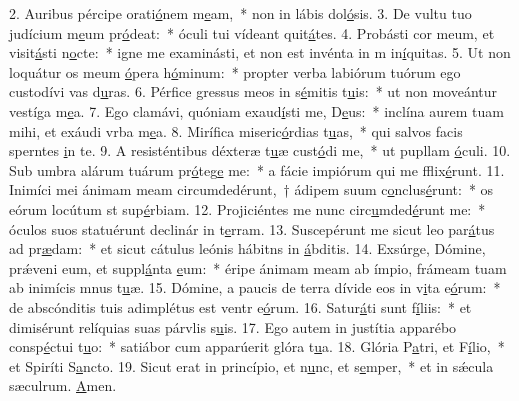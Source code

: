 2. Auribus pércipe orati\uline{ó}nem m\uline{e}am,~* non in lábis dol\uline{ó}sis.
3. De vultu tuo judícium m\uline{e}um pr\uline{ó}deat:~* óculi tui vídeant quit\uline{á}tes.
4. Probásti cor meum, et visit\uline{á}sti n\uline{o}cte:~* igne me examinásti, et non est invénta in m in\uline{í}quitas.
5. Ut non loquátur os meum \uline{ó}pera h\uline{ó}minum:~* propter verba labiórum tuórum ego custodívi vas d\uline{u}ras.
6. Pérfice gressus meos in s\uline{é}mitis t\uline{u}is:~* ut non moveántur vestíga m\uline{e}a.
7. Ego clamávi, quóniam exaud\uline{í}sti me, D\uline{e}us:~* inclína aurem tuam mihi, et exáudi vrba m\uline{e}a.
8. Mirífica miseric\uline{ó}rdias t\uline{u}as,~* qui salvos facis sperntes \uline{i}n te.
9. A resisténtibus déxteræ t\uline{u}æ cust\uline{ó}di me,~* ut pupllam \uline{ó}culi.
10. Sub umbra alárum tuárum pr\uline{ó}teg\uline{e} me:~* a fácie impiórum qui me fflix\uline{é}runt.
11. Inimíci mei ánimam meam circumdedérunt,~† ádipem suum c\uline{o}nclus\uline{é}runt:~* os eórum locútum st sup\uline{é}rbiam.
12. Projiciéntes me nunc circ\uline{u}mded\uline{é}runt me:~* óculos suos statuérunt declinár in t\uline{e}rram.
13. Suscepérunt me sicut leo par\uline{á}tus ad pr\uline{æ}dam:~* et sicut cátulus leónis hábitns in \uline{á}bditis.
14. Exsúrge, Dómine, prǽveni eum, et suppl\uline{á}nta \uline{e}um:~* éripe ánimam meam ab ímpio, frámeam tuam ab inimícis mnus t\uline{u}æ.
15. Dómine, a paucis de terra dívide eos in v\uline{i}ta e\uline{ó}rum:~* de abscónditis tuis adimplétus est ventr e\uline{ó}rum.
16. Satur\uline{á}ti sunt f\uline{í}liis:~* et dimisérunt relíquias suas párvlis s\uline{u}is.
17. Ego autem in justítia apparébo consp\uline{é}ctui t\uline{u}o:~* satiábor cum apparúerit glóra t\uline{u}a.
18. Glória P\uline{a}tri, et F\uline{í}lio,~* et Spiríti S\uline{a}ncto.
19. Sicut erat in princípio, et n\uline{u}nc, et s\uline{e}mper,~* et in sǽcula sæculrum. \uline{A}men.
